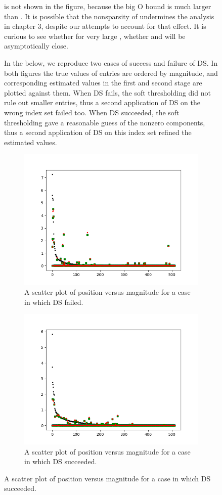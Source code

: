 \begin {figure} [H]
\m {\chi} is not shown in the figure, because the big O bound is much larger than \m {\tilde {\chi}}.
It is possible that the nonsparsity of  undermines the analysis in chapter 3, despite our attempts to account for that effect.
It is curious to see whether for very large , whether \m {\tilde {\chi}} and \m {\chi} will be asymptotically close.

In the below, we reproduce two cases of success and failure of DS.
In both figures the true values of  entries are ordered by magnitude, and corresponding estimated values in the first and second stage are plotted against them.
When DS fails, the soft thresholding did not rule out smaller entries, thus a second application of DS on the wrong index set failed too.
When DS succeeded, the soft thresholding gave a reasonable guess of the nonzero components, thus a second application of DS on this index set refined the estimated values.


\bigskip
\begin {figure} [H]
\includegraphics [width = 0.8 \textwidth] {scatter-ddss-failure.png}
\caption {A scatter plot of position versus magnitude for a case in which DS failed.}
\end {figure}
%
\begin {figure} [H]
\includegraphics [width = 0.8 \textwidth] {scatter-ddss-success.png}
\caption {A scatter plot of position versus magnitude for a case in which DS succeeded.}
\end {figure}
\bigskip


\end{figure}
